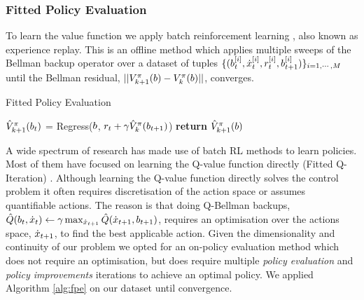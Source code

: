 \subsubsection{Fitted Policy Evaluation}

To learn the value function we apply batch reinforcement learning \cite{EGW05}, also known as experience replay.
This is an offline method which applies multiple sweeps of the Bellman backup operator 
over a dataset of tuples $\{(b^{[i]}_t,\dot{x}^{[i]}_t,r^{[i]}_{t},b^{[i]}_{t+1})\}_{i=1,\cdots,M}$ until the Bellman residual,
$||V^{\pi}_{k+1}(b) - V^{\pi}_{k}(b)||$, converges. 

\begin{algorithm} 
\caption{Fitted Policy Evaluation}
\label{alg:fpe}
\begin{algorithmic}[1]
        \State $\hat{V}^{\pi}_{k+1}(b_t)$ = Regress($b$, $r_t + \gamma \hat{V}^{\pi}_k(b_{t+1})$)
	  \State \textbf{return} $\hat{V}^{\pi}_{k+1}(b)$
	 \EndIf
    \EndFor
\end{algorithmic}
\end{algorithm}

A wide spectrum of research has made use of batch RL methods to learn policies. 
Most of them have focused on learning the Q-value function directly (Fitted Q-Iteration) 
\cite{NIPS2008_3501,EGW05,Riedmiller05neuralfitted}. Although learning the 
Q-value function directly solves the control problem it often requires discretisation 
of the action space or assumes quantifiable actions. The reason is that doing 
Q-Bellman backups, $\hat{Q}(b_t,\dot{x}_t) \leftarrow \gamma \max_{\dot{x}_{t+1}} \hat{Q}(\dot{x}_{t+1},b_{t+1})$, 
requires an optimisation over the actions space, $\dot{x}_{t+1}$, to find the best applicable action. 
Given the dimensionality and continuity of our problem we opted for an on-policy evaluation method
which does not require an optimisation, but does require multiple 
\textit{policy evaluation} and \textit{policy improvements} iterations to achieve an optimal policy.
We applied Algorithm \ref{alg:fpe} on our dataset until convergence.



